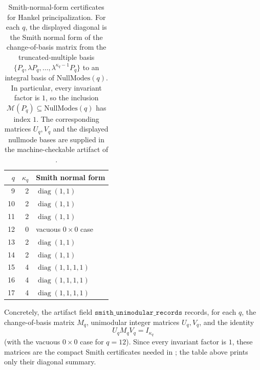 \begin{table}[t]
\centering
\scriptsize
\setlength{\tabcolsep}{6pt}
\caption{Smith-normal-form certificates for Hankel principalization.  For each
\(q\), the displayed diagonal is the
Smith normal form of the change-of-basis matrix from the truncated-multiple
basis \(\{P_q,\lambda P_q,\dots,\lambda^{\kappa_q-1}P_q\}\) to an integral
basis of \(\mathrm{NullModes}(q)\).  In particular, every invariant factor is
\(1\), so the inclusion \(\mathcal M(P_q)\subseteq \mathrm{NullModes}(q)\) has
index \(1\).  The corresponding matrices \(U_q,V_q\) and the displayed
nullmode bases are supplied in the machine-checkable artifact of
.}
\label{tab:appendix-principalization-q9-17}
\begin{tabular}{r r l}
\toprule
\(q\) & \(\kappa_q\) & Smith normal form \\
\midrule
9  & 2 & \(\operatorname{diag}(1,1)\) \\
10 & 2 & \(\operatorname{diag}(1,1)\) \\
11 & 2 & \(\operatorname{diag}(1,1)\) \\
12 & 0 & vacuous \(0\times 0\) case \\
13 & 2 & \(\operatorname{diag}(1,1)\) \\
14 & 2 & \(\operatorname{diag}(1,1)\) \\
15 & 4 & \(\operatorname{diag}(1,1,1,1)\) \\
16 & 4 & \(\operatorname{diag}(1,1,1,1)\) \\
17 & 4 & \(\operatorname{diag}(1,1,1,1)\) \\
\bottomrule
\end{tabular}
\end{table}

Concretely, the artifact field
\(\texttt{smith\_unimodular\_records}\) records, for each \(q\), the
change-of-basis matrix \(M_q\), unimodular integer matrices \(U_q,V_q\), and
the identity
\[
  U_qM_qV_q=I_{\kappa_q}
\]
(with the vacuous \(0\times0\) case for \(q=12\)).  Since every invariant factor
is \(1\), these matrices are the compact Smith certificates needed in
; the table above prints only their diagonal
summary.

